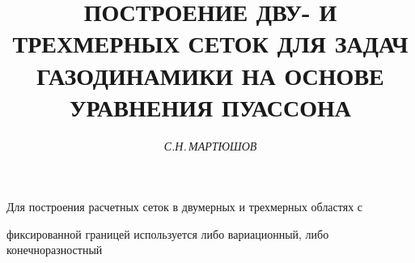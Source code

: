 






 




 


\newcommand{\A}{{\cal A}} 


\newcommand{\col}{\operatorname{col}} 


\newcommand{\sign}{\operatorname{sign}} 


 


\setcounter{page}{108} 








\author{\it С.Н.\,МАРТЮШОВ} 


\title{ПОСТРОЕНИЕ ДВУ- И ТРЕХМЕРНЫХ СЕТОК ДЛЯ ЗАДАЧ\\ 


ГАЗОДИНАМИКИ НА ОСНОВЕ УРАВНЕНИЯ ПУАССОНА} 


 




\date{} 


\pagestyle{plain} 


 


 


\maketitle 


 




 


Для построения расчетных сеток в двумерных и трехмерных областях с 


фиксированной границей используется либо вариационный, либо конечноразностный 



